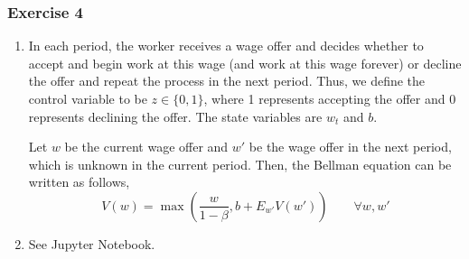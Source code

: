 \documentclass[letterpaper,12pt]{article}
\theoremstyle{definition}
\begin{document}
\subsubsection*{Exercise 4}
\begin{enumerate}
  \item In each period, the worker receives a wage offer and decides whether to accept and begin work at this wage (and work at this wage forever) or decline the offer and repeat the process in the next period. Thus, we define the control variable to be $z \in \{0,1\}$, where 1 represents accepting the offer and 0 represents declining the offer. The state variables are $w_t$ and $b$.

  Let $w$ be the current wage offer and $w'$ be the wage offer in the next period, which is unknown in the current period. Then, the Bellman equation can be written as follows,
  \begin{equation}
    V(w) = \max\left( \frac{w}{1-\beta}, b + E_{w'}V(w') \right) \qquad \forall w, w'
  \end{equation}
  \item See Jupyter Notebook.
\end{enumerate}
\end{document}
